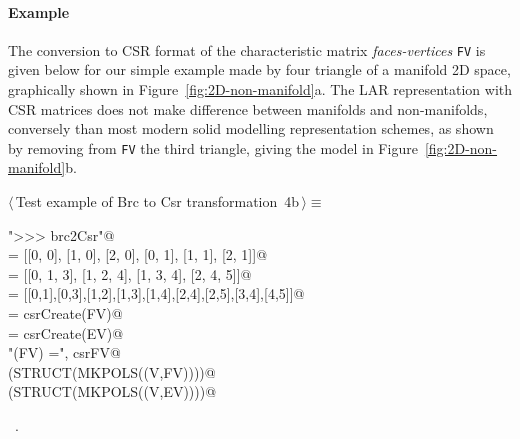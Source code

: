 \documentclass[11pt,oneside]{article}    %
\begin{document}
\paragraph{Example}
The conversion to CSR format of the characteristic matrix \emph{faces-vertices} \texttt{FV} is given below for our simple example made by four triangle of a manifold 2D space, graphically shown in Figure~\ref{fig:2D-non-manifold}a. The LAR representation with CSR matrices does not make difference between manifolds and non-manifolds, conversely than most modern solid modelling representation schemes, as shown by removing from \texttt{FV} the third triangle, giving the model in Figure~\ref{fig:2D-non-manifold}b.
\begin{flushleft} \small \label{scrap7}
\protect{}$\langle\,$Test example of Brc to Csr transformation\nobreak\ {\footnotesize 4b}$\,\rangle\equiv$
\vspace{-1ex}
\begin{list}{}{} \item
\mbox{}\verb@print "\n>>> brc2Csr"@\\
\mbox{}\verb@V = [[0, 0], [1, 0], [2, 0], [0, 1], [1, 1], [2, 1]]@\\
\mbox{}\verb@FV = [[0, 1, 3], [1, 2, 4], [1, 3, 4], [2, 4, 5]]@\\
\mbox{}\verb@EV = [[0,1],[0,3],[1,2],[1,3],[1,4],[2,4],[2,5],[3,4],[4,5]]@\\
\mbox{}\verb@csrFV = csrCreate(FV)@\\
\mbox{}\verb@csrEV = csrCreate(EV)@\\
\mbox{}\verb@print "\ncsrCreate(FV) =\n", csrFV@\\
\mbox{}\verb@VIEW(STRUCT(MKPOLS((V,FV))))@\\
\mbox{}\verb@VIEW(STRUCT(MKPOLS((V,EV))))@\\
\mbox{}\verb@@{\NWsep}
\end{list}
\vspace{-1ex}
\footnotesize\addtolength{\baselineskip}{-1ex}
\begin{list}{}{\setlength{\itemsep}{-\parsep}\setlength{\itemindent}{-\leftmargin}}
\item \NWtxtMacroRefIn\ .
\end{list}
\end{flushleft}
\end{document}
